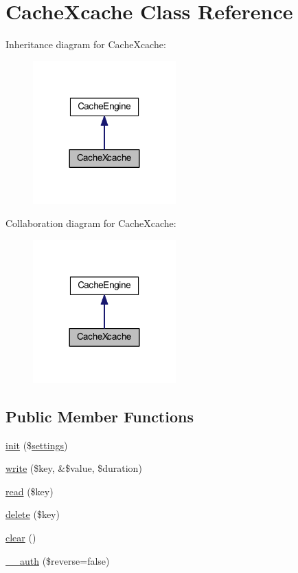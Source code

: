 \hypertarget{class_cache_xcache}{\section{Cache\-Xcache Class Reference}
\label{class_cache_xcache}
}


Inheritance diagram for Cache\-Xcache\-:
\nopagebreak
\begin{figure}[H]
\begin{center}
\leavevmode
\includegraphics[width=156pt]{class_cache_xcache__inherit__graph}
\end{center}
\end{figure}


Collaboration diagram for Cache\-Xcache\-:
\nopagebreak
\begin{figure}[H]
\begin{center}
\leavevmode
\includegraphics[width=156pt]{class_cache_xcache__coll__graph}
\end{center}
\end{figure}
\subsection*{Public Member Functions}
\begin{DoxyCompactItemize}
\item 
\hyperlink{class_cache_xcache_a5a352605cb6d44ea8c1b059e6413589c}{init} (\$\hyperlink{class_cache_engine_ad7354383714c6ae99d6ee1bfb95ab49f}{settings})
\item 
\hyperlink{class_cache_xcache_a0e72b4e1d3c5ff461155883cad18358d}{write} (\$key, \&\$value, \$duration)
\item 
\hyperlink{class_cache_xcache_a4c50c958c469c08bba0c0ccb710ca8af}{read} (\$key)
\item 
\hyperlink{class_cache_xcache_aa74a2edd6f3cbb5c5353f7faa97b6d70}{delete} (\$key)
\item 
\hyperlink{class_cache_xcache_aa821bec12eaa7e0f649397c9675ff505}{clear} ()
\item 
\hyperlink{class_cache_xcache_ab427c2e7c1591f5e7dd6818f65a38a62}{\-\_\-\-\_\-auth} (\$reverse=false)
\end{DoxyCompactItemize}
